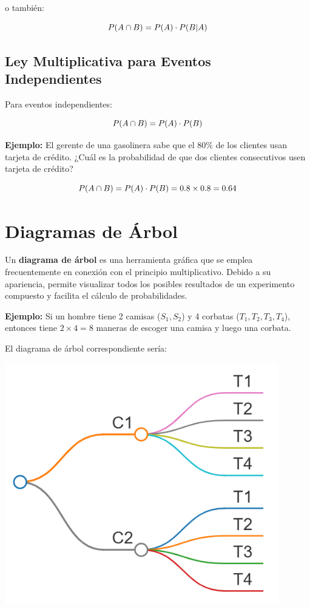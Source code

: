 \documentclass[
  spanish,
  letterpaper,
]{book}
\begin{document}
o también:

\[\LARGE P(A \cap B) = P(A) \cdot P(B|A)\]

\subsection{Ley Multiplicativa para Eventos
Independientes}\label{ley-multiplicativa-para-eventos-independientes}

Para eventos independientes:

\[\LARGE P(A \cap B) = P(A) \cdot P(B)\]

\textbf{Ejemplo:} El gerente de una gasolinera sabe que el 80\% de los
clientes usan tarjeta de crédito. ¿Cuál es la probabilidad de que dos
clientes consecutivos usen tarjeta de crédito?

\[\LARGE P(A \cap B) = P(A) \cdot P(B) = 0.8 \times 0.8 = 0.64\]

\section{Diagramas de Árbol}\label{diagramas-de-uxe1rbol}

Un \textbf{diagrama de árbol} es una herramienta gráfica que se emplea
frecuentemente en conexión con el principio multiplicativo. Debido a su
apariencia, permite visualizar todos los posibles resultados de un
experimento compuesto y facilita el cálculo de probabilidades.

\textbf{Ejemplo:} Si un hombre tiene 2 camisas (\(S_1, S_2\)) y 4
corbatas (\(T_1, T_2, T_3, T_4\)), entonces tiene \(2 \times 4 = 8\)
maneras de escoger una camisa y luego una corbata.

El diagrama de árbol correspondiente sería:

\begin{center}
\includegraphics[width=4.6875in,height=\textheight,keepaspectratio]{diagrama_ct.png}
\end{center}
\end{document}
